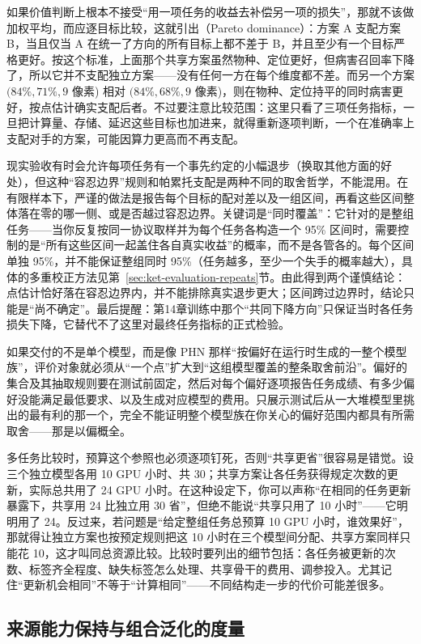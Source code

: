 如果价值判断上根本不接受“用一项任务的收益去补偿另一项的损失”，那就不该做加权平均，而应逐目标比较，这就引出（Pareto dominance）：方案 A 支配方案 B，当且仅当 A 在统一了方向的所有目标上都不差于 B，并且至少有一个目标严格更好。按这个标准，上面那个共享方案虽然物种、定位更好，但病害召回率下降了，所以它并不支配独立方案——没有任何一方在每个维度都不差。而另一个方案 $(84\%,71\%,9$ 像素) 相对 $(84\%,68\%,9$ 像素)，则在物种、定位持平的同时病害更好，按点估计确实支配后者。不过要注意比较范围：这里只看了三项任务指标，一旦把计算量、存储、延迟这些目标也加进来，就得重新逐项判断，一个在准确率上支配对手的方案，可能因算力更高而不再支配。

现实验收有时会允许每项任务有一个事先约定的小幅退步（换取其他方面的好处），但这种“容忍边界”规则和帕累托支配是两种不同的取舍哲学，不能混用。在有限样本下，严谨的做法是报告每个目标的配对差以及一组区间，再看这些区间整体落在零的哪一侧、或是否越过容忍边界。关键词是“同时覆盖”：它针对的是整组任务——当你反复按同一协议取样并为每个任务各构造一个 95\% 区间时，需要控制的是“所有这些区间一起盖住各自真实收益”的概率，而不是各管各的。每个区间单独 95\%，并不能保证整组同时 95\%（任务越多，至少一个失手的概率越大），具体的多重校正方法见第~\ref{sec:ket-evaluation-repeats}节。由此得到两个谨慎结论：点估计恰好落在容忍边界内，并不能排除真实退步更大；区间跨过边界时，结论只能是“尚不确定”。最后提醒：第14章训练中那个“共同下降方向”只保证当时各任务损失下降，它替代不了这里对最终任务指标的正式检验。

如果交付的不是单个模型，而是像 PHN 那样“按偏好在运行时生成的一整个模型族”，评价对象就必须从“一个点”扩大到“这组模型覆盖的整条取舍前沿”。偏好的集合及其抽取规则要在测试前固定，然后对每个偏好逐项报告任务成绩、有多少偏好没能满足最低要求、以及生成对应模型的费用。只展示测试后从一大堆模型里挑出的最有利的那一个，完全不能证明整个模型族在你关心的偏好范围内都具有所需取舍——那是以偏概全。

多任务比较时，预算这个参照也必须逐项钉死，否则“共享更省”很容易是错觉。设三个独立模型各用 10 GPU 小时、共 30；共享方案让各任务获得规定次数的更新，实际总共用了 24 GPU 小时。在这种设定下，你可以声称“在相同的任务更新暴露下，共享用 24 比独立用 30 省”，但绝不能说“共享只用了 10 小时”——它明明用了 24。反过来，若问题是“给定整组任务总预算 10 GPU 小时，谁效果好”，那就得让独立方案也按预定规则把这 10 小时在三个模型间分配、共享方案同样只能花 10，这才叫同总资源比较。比较时要列出的细节包括：各任务被更新的次数、标签齐全程度、缺失标签怎么处理、共享骨干的费用、调参投入。尤其记住“更新机会相同”不等于“计算相同”——不同结构走一步的代价可能差很多。

\subsection{来源能力保持与组合泛化的度量}
\label{sec:ket-evaluation-composition}

